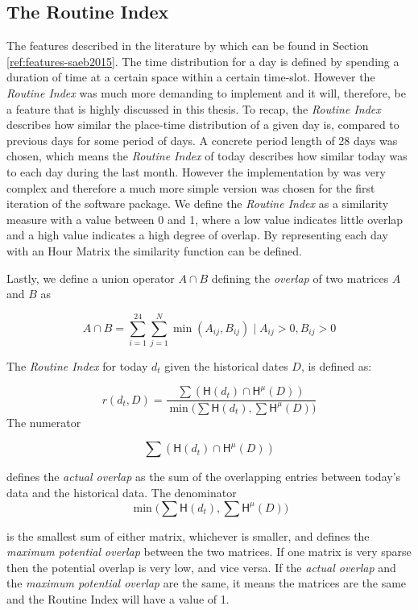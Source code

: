 \subsection{The Routine Index}
The features described in the literature by \cite{Saeb2015} which can be found in Section \ref{ref:features-saeb2015}. The time distribution for a day is defined by spending a duration of time at a certain space within a certain time-slot.  However the \textit{Routine Index} \cite{Saeb2015, Canzian2015} was much more demanding to implement and it will, therefore, be a feature that is highly discussed in this thesis. To recap, the \textit{Routine Index} describes how similar the place-time distribution of a given day is, compared to previous days for some period of days. A concrete period length of 28 days was chosen, which means the \textit{Routine Index} of today describes how similar today was to each day during the last month. However the implementation by \cite{Canzian2015} was very complex and therefore a much more simple version was chosen for the first iteration of the software package. We define the \textit{Routine Index} as a similarity measure with a value between 0 and 1, where a low value indicates little overlap and a high value indicates a high degree of overlap. By representing each day with an Hour Matrix the similarity function can be defined.

Lastly, we define a union operator $A \cap B$ defining the \textit{overlap} of two matrices $A$ and $B$ as 

$$A \cap B = \sum_{i=1}^{24} \sum_{j=1}^{N} \min (A_{ij}, B_{ij}) \;|\; A_{ij} > 0, B_{ij} > 0$$

The \textit{Routine Index} for today $d_t$ given the historical dates $D$, is defined as: 

$$r(d_t, D) = \frac{\sum (\mathsf{H}(d_t) \cap \mathsf{H}^{\mu} (D) )}{\min \Big(\sum \mathsf{H}(d_t), \sum \mathsf{H}^{\mu} (D) \Big)}$$
The numerator 

$$\sum (\mathsf{H}(d_t) \cap \mathsf{H}^{\mu} (D) )$$

defines the \textit{actual overlap} as the sum of the overlapping entries between today's data and the historical data. The denominator 
$$\min \Big(\sum \mathsf{H}(d_t), \sum \mathsf{H}^{\mu} (D) \Big)$$ 

is the smallest sum of either matrix, whichever is smaller, and defines the \textit{maximum potential overlap} between the two matrices. If one matrix is very sparse then the potential overlap is very low, and vice versa. If the \textit{actual overlap} and the \textit{maximum potential overlap} are the same, it means the matrices are the same and the Routine Index will have a value of 1. 


